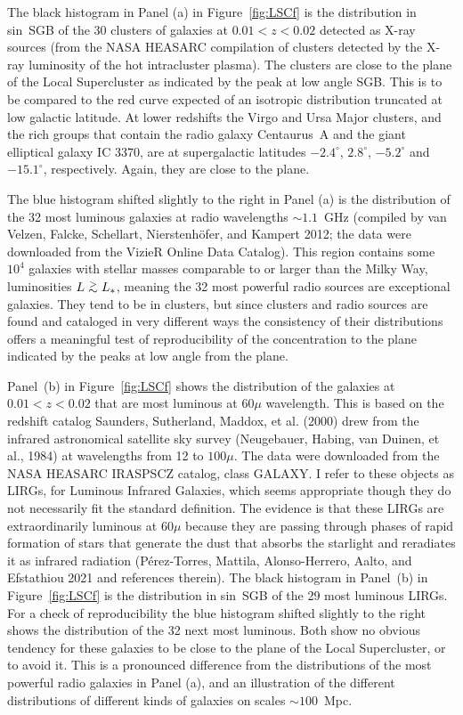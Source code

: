 \documentclass[fleqn,12pt]{article}
\def\gap{\lower.5ex\hbox{$\; \buildrel > \over \sim \;$}}
\begin{document}
The black histogram in Panel (a) in Figure~\ref{fig:LSCf}  is the distribution in sin~SGB of the 30 clusters of galaxies at $0.01 < z < 0.02$ detected as X-ray sources (from the NASA HEASARC compilation of clusters detected by the X-ray luminosity of the hot intracluster plasma). The clusters are close to the plane of the Local Supercluster as indicated by the peak at low angle SGB. This is to be compared to the red curve expected of an isotropic distribution truncated at low galactic latitude. At lower redshifts the Virgo and Ursa Major clusters, and the rich groups that contain the radio galaxy Centaurus~A and the giant elliptical galaxy IC 3370, are at supergalactic latitudes $-2.4^\circ$, $2.8^\circ$, $-5.2^\circ$ and $-15.1^\circ$, respectively. Again, they are close to the plane.

The blue histogram shifted slightly to the right in Panel (a) is the distribution of the 32 most luminous galaxies at radio wavelengths $\sim 1.1$~GHz (compiled by van Velzen, Falcke, Schellart, Nierstenh{\"o}fer, and Kampert 2012; the data were downloaded from the VizieR Online Data Catalog). This region contains some $10^4$ galaxies with stellar masses comparable to or larger than the Milky Way, luminosities $L\gap L_\ast$, meaning the 32 most powerful radio sources are exceptional galaxies. They tend to be in clusters, but since clusters and radio sources are found and cataloged in very different ways the consistency of their distributions offers a meaningful test of reproducibility of the concentration to the plane indicated by the peaks at low angle from the plane. 

Panel~(b) in Figure~\ref{fig:LSCf} shows the distribution of the galaxies at $0.01<z<0.02$ that are most luminous at $60\mu$ wavelength. This is based on the redshift catalog Saunders, Sutherland, Maddox, et al. (2000) drew from the infrared astronomical satellite sky survey (Neugebauer, Habing, van Duinen, et al., 1984) at wavelengths from 12 to $100\mu$. The data were downloaded from the NASA HEASARC IRASPSCZ catalog, class GALAXY.  I refer to these objects as LIRGs, for Luminous Infrared Galaxies, which seems appropriate though they do not necessarily fit the standard definition. The evidence is that these LIRGs are extraordinarily luminous at $60\mu$ because they are passing through phases of rapid formation of stars that generate the dust that absorbs the starlight and reradiates it as infrared radiation (P{\'e}rez-Torres, Mattila, Alonso-Herrero, Aalto, and Efstathiou 2021 and references therein). The black histogram  in Panel~(b) in Figure~\ref{fig:LSCf} is the distribution in sin~SGB of the 29 most luminous LIRGs. For a check of reproducibility the blue histogram shifted slightly to the right shows the distribution of the 32 next most luminous. Both show no obvious tendency for these galaxies to be close to the plane of the Local Supercluster, or to avoid it. This is a pronounced difference from the distributions of the most powerful radio galaxies in Panel (a), and an illustration of the different distributions of different kinds of galaxies on scales $\sim 100$~Mpc.
\end{document}
